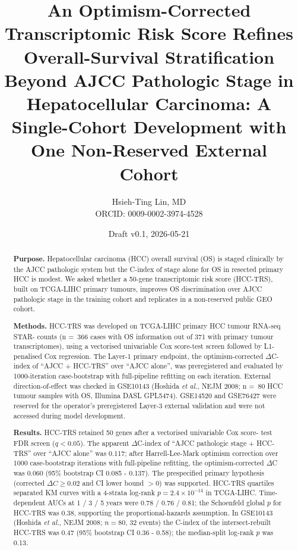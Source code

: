 \documentclass[12pt]{article}
\title{An Optimism-Corrected Transcriptomic Risk Score Refines Overall-Survival Stratification Beyond AJCC Pathologic Stage in Hepatocellular Carcinoma: A Single-Cohort Development with One Non-Reserved External Cohort}
\author{Hsieh-Ting Lin, MD \\
  ORCID: 0009-0002-3974-4528}
\date{Draft v0.1, 2026-05-21}
\newcommand{\HCCRTS}{HCC-TRS\xspace}
\begin{document}
\maketitle

\begin{abstract}
\noindent\textbf{Purpose.}
Hepatocellular carcinoma (HCC) overall survival (OS) is staged
clinically by the AJCC pathologic system but the C-index of stage
alone for OS in resected primary HCC is modest. We asked whether a
50-gene transcriptomic risk score (\HCCRTS), built on TCGA-LIHC primary
tumours, improves OS discrimination over AJCC pathologic stage in the
training cohort and replicates in a non-reserved public GEO cohort.

\textbf{Methods.}
\HCCRTS was developed on TCGA-LIHC primary HCC tumour RNA-seq STAR-
counts (n =~366 cases with OS information out of 371 with primary
tumour transcriptomes), using a vectorised univariable Cox score-test
screen followed by L1-penalised Cox regression. The Layer-1 primary
endpoint, the optimism-corrected $\Delta$C-index of ``AJCC + \HCCRTS'' over
``AJCC alone'', was preregistered and evaluated by 1000-iteration
case-bootstrap with full-pipeline refitting on each iteration. External
direction-of-effect was checked in GSE10143 (Hoshida \emph{et al.},
NEJM 2008; n =~80 HCC tumour samples with OS, Illumina DASL GPL5474).
GSE14520 and GSE76427 were reserved for the operator's preregistered
Layer-3 external validation and were not accessed during model
development.

\textbf{Results.}
\HCCRTS retained 50 genes after a vectorised univariable Cox score-
test FDR screen ($q < 0.05$). The apparent $\Delta$C-index of ``AJCC
pathologic stage + \HCCRTS'' over ``AJCC alone'' was 0.117; after
Harrell-Lee-Mark optimism correction over 1000 case-bootstrap
iterations with full-pipeline refitting, the optimism-corrected
$\Delta$C was 0.060 (95\% bootstrap CI 0.085 - 0.137). The
prespecified primary hypothesis (corrected $\Delta C \geq 0.02$ and
CI lower bound $> 0$) was supported. \HCCRTS quartiles separated KM
curves with a 4-strata log-rank $p = 2.4 \times 10^{-14}$ in TCGA-LIHC.
Time-dependent AUCs at 1 / 3 / 5 years were 0.78 / 0.76 / 0.81; the
Schoenfeld global $p$ for \HCCRTS was 0.38, supporting the
proportional-hazards assumption. In GSE10143 (Hoshida \emph{et al.},
NEJM 2008; $n = 80$, 32 events) the C-index of the intersect-rebuilt
\HCCRTS was 0.47 (95\% bootstrap CI 0.36 - 0.58); the median-split
log-rank $p$ was 0.13.


\end{abstract}
\end{document}
